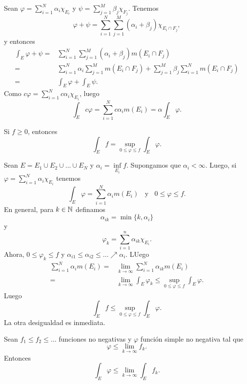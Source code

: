     \begin{demo}
    Sean $\varphi=\sum\limits_{i=1}^N \alpha_i \chi_{E_i}$ y $\psi=\sum\limits_{j=1}^M \beta_j \chi_{F_j}$. 
    Tenemos 
    \[
    \varphi+\psi=
    \sum\limits_{i=1}^N\sum\limits_{j=1}^M (\alpha_i+\beta_j) \chi_{E_i \cap F_j},
    \]
    y entonces
    \[
    \begin{split}
    \int_E \varphi+\psi=& 
    \sum\limits_{i=1}^N\sum\limits_{j=1}^M (\alpha_i+\beta_j) m(E_i \cap F_j)
    \\
    =&\sum\limits_{i=1}^N \alpha_i \sum\limits_{j=1}^M m(E_i \cap F_j)+
    \sum\limits_{j=1}^M \beta_j \sum\limits_{i=1}^N m(E_i \cap F_j)
    \\
    =&\int_E \varphi +\int_E \psi.
    \end{split}
        \]
    Como $c\varphi=\sum\limits_{i=1}^N c \alpha_i \chi_{E_i}$, luego
    \[
    \int_E c\varphi = \sum\limits_{i=1}^N c\alpha_i m(E_i)=\alpha \int_E \varphi.
    \]
    \end{demo}
    
    \begin{teorema}{}
    Si $f\geq 0$, entonces
    \[\int_E f = \sup\limits_{0\leq \varphi\leq f} \int_E \varphi.\]
    \end{teorema}
    
    \begin{demo}
    Sean $E=E_1\cup E_2\cup\ldots \cup E_N$ y $\alpha_i=\inf\limits_{E_i} f$. 
    Supongamos que $\alpha_i<\infty$. Luego, si $\varphi=\sum\limits_{i=1}^N \alpha_i \chi_{E_i}$ tenemos 
    \[
    \int_E \varphi =\sum\limits_{i=1}^N \alpha_i m(E_i)\;\;
    \mbox{ y }\;\; 0\leq \varphi \leq f.
    \]
    En general, para $k\in \mathbb{N}$ definamos 
    \[\alpha_{ik}=\min\{k,\alpha_i\}\]
    y 
    \[ \varphi_k=\sum\limits_{i=1}^n \alpha_{ik} \chi_{E_i}.\]
    Ahora, $0\leq \varphi_k \leq f$ y $\alpha_{i1}\leq \alpha_{i2}\leq \ldots \nearrow \alpha_i$. 
    LUego 
    \[
    \begin{split}
    \sum\limits_{i=1}^N \alpha_i m(E_i)=&
    \lim\limits_{k \to \infty} \sum\limits_{i=1}^N \alpha_{ik} m(E_i)
    \\
    =&\lim\limits_{k \to \infty} \int_E \varphi_k 
     \leq  \sup\limits_{0\leq \varphi \leq f} \int_E \varphi.
    \end{split}
    \]
    Luego
    \[
    \int_E f \leq \sup\limits_{0\leq \varphi \leq f} \int_E \varphi.
    \]    
    La otra desigualdad es inmediata.
    \end{demo}
    
    
    \begin{lema}{}
    Sean $f_1\leq f_2\leq \ldots$ funciones no negativas y $\varphi$ funci\'on simple no negativa tal que 
    \[
    \varphi \leq \lim\limits_{k \to \infty} f_k.
    \]
   Entonces  
        \[
    \int_E\varphi \leq \lim\limits_{k \to \infty} \int_Ef_k.
    \]
   
    \end{lema}
    
